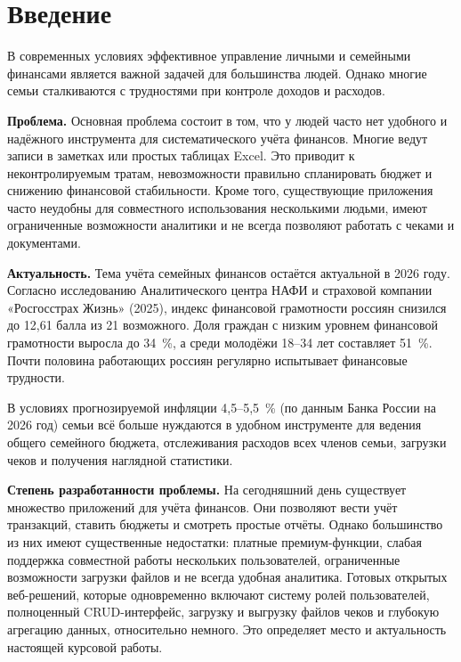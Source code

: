 \section*{Введение}

В современных условиях эффективное управление личными и семейными финансами является важной задачей для большинства людей. Однако многие семьи сталкиваются с трудностями при контроле доходов и расходов.

\textbf{Проблема.} Основная проблема состоит в том, что у людей часто нет удобного и надёжного инструмента для систематического учёта финансов. Многие ведут записи в заметках или простых таблицах Excel. Это приводит к неконтролируемым тратам, невозможности правильно спланировать бюджет и снижению финансовой стабильности. Кроме того, существующие приложения часто неудобны для совместного использования несколькими людьми, имеют ограниченные возможности аналитики и не всегда позволяют работать с чеками и документами.

\textbf{Актуальность.} Тема учёта семейных финансов остаётся актуальной в 2026 году. Согласно исследованию Аналитического центра НАФИ и страховой компании «Росгосстрах Жизнь» (2025)\cite{nafi2025}, индекс финансовой грамотности россиян снизился до 12,61 балла из 21 возможного. Доля граждан с низким уровнем финансовой грамотности выросла до 34~\%, а среди молодёжи 18--34 лет составляет 51~\%. Почти половина работающих россиян регулярно испытывает финансовые трудности.

В условиях прогнозируемой инфляции 4,5--5,5~\% (по данным Банка России на 2026 год)\cite{cbr2026} семьи всё больше нуждаются в удобном инструменте для ведения общего семейного бюджета, отслеживания расходов всех членов семьи, загрузки чеков и получения наглядной статистики.

\textbf{Степень разработанности проблемы.} На сегодняшний день существует множество приложений для учёта финансов. Они позволяют вести учёт транзакций, ставить бюджеты и смотреть простые отчёты. Однако большинство из них имеют существенные недостатки: платные премиум-функции, слабая поддержка совместной работы нескольких пользователей, ограниченные возможности загрузки файлов и не всегда удобная аналитика. Готовых открытых веб-решений, которые одновременно включают систему ролей пользователей, полноценный CRUD-интерфейс, загрузку и выгрузку файлов чеков и глубокую агрегацию данных, относительно немного. Это определяет место и актуальность настоящей курсовой работы.

